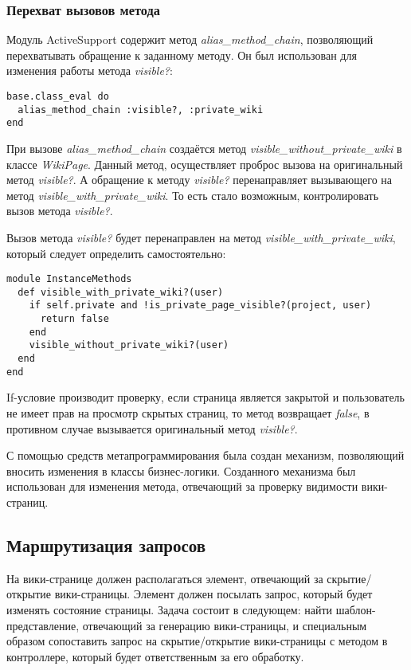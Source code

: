 \subsubsection{Перехват вызовов метода}
Модуль ActiveSupport содержит метод \textit{alias\_method\_chain}, позволяющий
перехватывать обращение к заданному методу. Он был использован для изменения
работы метода \textit{visible?}:
\small{\begin{lstlisting}
base.class_eval do
  alias_method_chain :visible?, :private_wiki
end
\end{lstlisting}}
При вызове \textit{alias\_method\_chain} создаётся метод
\textit{visible\_without\_private\_wiki} в классе \textit{WikiPage}. Данный
метод, осуществляет проброс вызова на оригинальный метод \textit{visible?}. А
обращение к методу \textit{visible?} перенаправляет вызывающего на метод
\textit{visible\_with\_private\_wiki}. То есть стало возможным, контролировать
вызов метода \textit{visible?}.

Вызов метода \textit{visible?} будет перенаправлен на метод
\textit{visible\_with\_private\_wiki}, который следует определить
самостоятельно:
\small{\begin{lstlisting}
module InstanceMethods
  def visible_with_private_wiki?(user)
    if self.private and !is_private_page_visible?(project, user)
      return false
    end
    visible_without_private_wiki?(user)
  end
end
\end{lstlisting}}
If-условие производит проверку, если страница является закрытой и пользователь
не имеет прав на просмотр скрытых страниц, то метод возвращает \textit{false},
в противном случае вызывается оригинальный метод \textit{visible?}. 

С помощью средств метапрограммирования была создан механизм, позволяющий
вносить изменения в классы бизнес-логики. Созданного механизма был использован
для изменения метода, отвечающий за проверку видимости вики-страниц.


\subsection{Маршрутизация запросов}
\label{section:routing}
На вики-странице должен располагаться элемент, отвечающий за скрытие/открытие
вики-страницы. Элемент должен посылать запрос, который будет изменять состояние
страницы. Задача состоит в следующем: найти шаблон-представление, отвечающий за
генерацию вики-страницы, и специальным образом сопоставить запрос на
скрытие/открытие вики-страницы с методом в контроллере, который будет
ответственным за его обработку.

